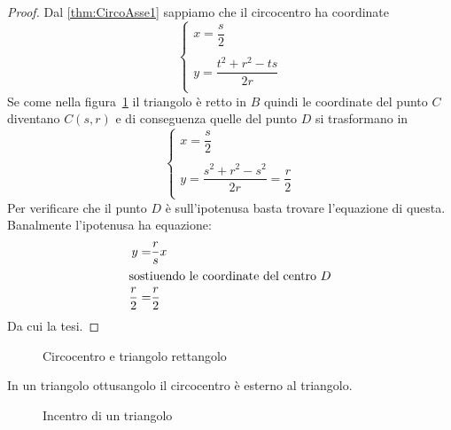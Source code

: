 \begin{proof}
	Dal \cref{thm:CircoAsse1} sappiamo che il circocentro ha coordinate
	\[	\begin{cases}
	x=\dfrac{s}{2}\\ \\
	y=\dfrac{t^2+r^2-ts}{2r}\\
	\end{cases}\]
	Se come nella figura~\cref{fig:circumcerchio3} il triangolo è retto in $B$ quindi le coordinate del punto $C$ diventano $C(s,r)$ e di conseguenza quelle del punto $D$ si trasformano in 	\[\begin{cases}
	x=\dfrac{s}{2}\\ \\
	y=\dfrac{s^2+r^2-s^2}{2r}=\dfrac{r}{2}\\
	\end{cases}\]Per verificare che il punto $D$ è sull'ipotenusa basta trovare l'equazione di questa. Banalmente l'ipotenusa ha equazione:
	\begin{align*}
	y=&\dfrac{r}{s}x\\
	\intertext{sostiuendo le coordinate del centro $D$}
	\dfrac{r}{2}=&\dfrac{r}{2}
	\end{align*}
	Da cui la tesi.
\end{proof}
\begin{figure}
	\centering
	
	\caption{Circocentro e triangolo rettangolo}
	\label{fig:circumcerchio3}
\end{figure}
\begin{cor}\label{cor:CircoAsse2}
	In un triangolo ottusangolo il circocentro è esterno al triangolo.
\end{cor}
\begin{figure}
	\centering
	
	\caption{Incentro di un triangolo}
	\label{fig:incentro1}
\end{figure}
